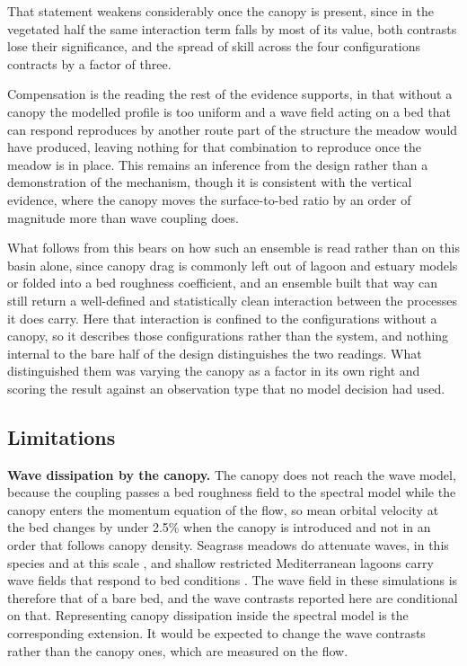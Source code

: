 That statement weakens considerably once the canopy is present, since in the
vegetated half the same interaction term falls by most of its value, both
contrasts lose their significance, and the spread of skill across the four
configurations contracts by a factor of three.

Compensation is the reading the rest of the evidence supports, in that without a
canopy the modelled profile is too uniform and a wave field acting on a bed that
can respond reproduces by another route part of the structure the meadow would
have produced, leaving nothing for that combination to reproduce once the meadow
is in place. This remains an inference from the design rather than a
demonstration of the mechanism, though it is consistent with the vertical
evidence, where the canopy moves the surface-to-bed ratio by an order of
magnitude more than wave coupling does.

What follows from this bears on how such an ensemble is read rather than on this
basin alone, since canopy drag is commonly left out of lagoon and estuary models
or folded into a bed roughness coefficient, and an ensemble built that way can
still return a well-defined and statistically clean interaction between the
processes it does carry. Here that interaction is confined to the configurations
without a canopy, so it describes those configurations rather than the system,
and nothing internal to the bare half of the design distinguishes the two
readings. What distinguished them was varying the canopy as a factor in its own
right and scoring the result against an observation type that no model decision
had used.

\subsection{Limitations}
\label{sec:disc_limits}

\textbf{Wave dissipation by the canopy.} The canopy does not reach the wave
model, because the coupling passes a bed roughness field to the spectral model
while the canopy enters the momentum equation of the flow, so mean orbital
velocity at the bed
changes by under 2.5\% when the canopy is introduced and not in an order that
follows canopy density. Seagrass meadows do attenuate waves, in this species and
at this scale \citep{Infantes2012, Prinos2010}, and shallow restricted
Mediterranean lagoons carry wave fields that respond to bed conditions
\citep{Morote2025}. The wave field in these simulations is therefore that of a
bare bed, and the wave contrasts reported here are conditional on that.
Representing canopy dissipation inside the spectral model is the corresponding
extension. It would be expected to change the wave contrasts rather than the canopy
ones, which are measured on the flow.


